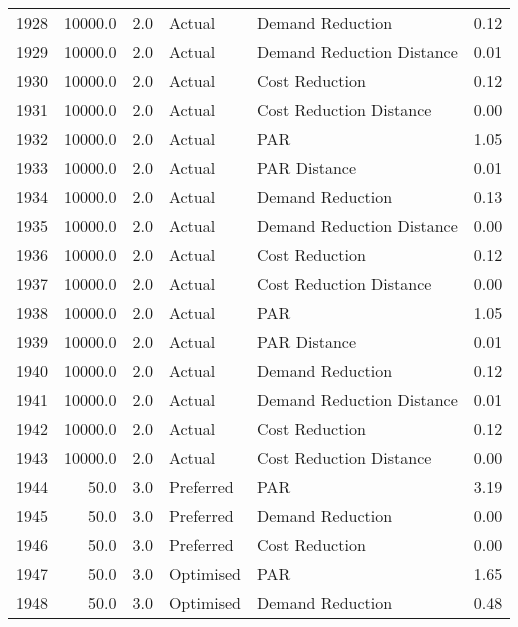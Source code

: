 \begin{longtable}{lrrllr}
1928 &      10000.0 &     2.0 &         Actual &           Demand Reduction &   0.12 \\
1929 &      10000.0 &     2.0 &         Actual &  Demand Reduction Distance &   0.01 \\
1930 &      10000.0 &     2.0 &         Actual &             Cost Reduction &   0.12 \\
1931 &      10000.0 &     2.0 &         Actual &    Cost Reduction Distance &   0.00 \\
1932 &      10000.0 &     2.0 &         Actual &                        PAR &   1.05 \\
1933 &      10000.0 &     2.0 &         Actual &               PAR Distance &   0.01 \\
1934 &      10000.0 &     2.0 &         Actual &           Demand Reduction &   0.13 \\
1935 &      10000.0 &     2.0 &         Actual &  Demand Reduction Distance &   0.00 \\
1936 &      10000.0 &     2.0 &         Actual &             Cost Reduction &   0.12 \\
1937 &      10000.0 &     2.0 &         Actual &    Cost Reduction Distance &   0.00 \\
1938 &      10000.0 &     2.0 &         Actual &                        PAR &   1.05 \\
1939 &      10000.0 &     2.0 &         Actual &               PAR Distance &   0.01 \\
1940 &      10000.0 &     2.0 &         Actual &           Demand Reduction &   0.12 \\
1941 &      10000.0 &     2.0 &         Actual &  Demand Reduction Distance &   0.01 \\
1942 &      10000.0 &     2.0 &         Actual &             Cost Reduction &   0.12 \\
1943 &      10000.0 &     2.0 &         Actual &    Cost Reduction Distance &   0.00 \\
1944 &         50.0 &     3.0 &      Preferred &                        PAR &   3.19 \\
1945 &         50.0 &     3.0 &      Preferred &           Demand Reduction &   0.00 \\
1946 &         50.0 &     3.0 &      Preferred &             Cost Reduction &   0.00 \\
1947 &         50.0 &     3.0 &      Optimised &                        PAR &   1.65 \\
1948 &         50.0 &     3.0 &      Optimised &           Demand Reduction &   0.48 \\

\end{longtable}
